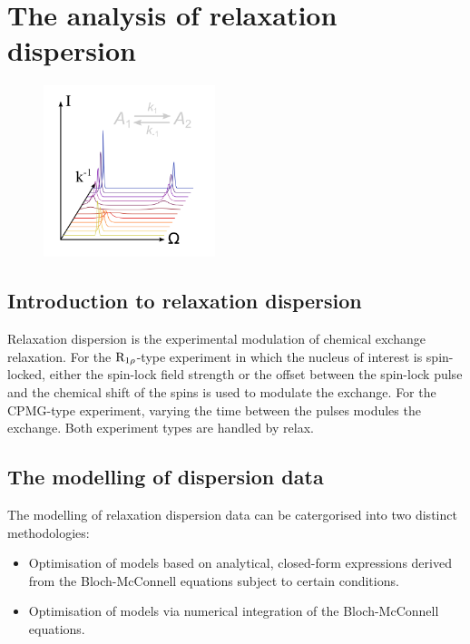 
\chapter[Relaxation dispersion]{The analysis of relaxation dispersion} \label{ch: relax-disp}

\begin{figure}[h]
\includegraphics[width=5cm, bb=0 0 1701 1701]{graphics/analyses/relax_disp_600x600}
\end{figure}



\section{Introduction to relaxation dispersion}

Relaxation dispersion is the experimental modulation of chemical exchange relaxation.  For the $\mathrm{R}_{1\rho}$-type experiment in which the nucleus of interest is spin-locked, either the spin-lock field strength or the offset between the spin-lock pulse and the chemical shift of the spins is used to modulate the exchange.  For the CPMG-type experiment, varying the time between the pulses modules the exchange.  Both experiment types are handled by relax.



\section{The modelling of dispersion data}

The modelling of relaxation dispersion data can be catergorised into two distinct methodologies:

\begin{itemize}
\item Optimisation of models based on analytical, closed-form expressions derived from the Bloch-McConnell equations subject to certain conditions.
\item Optimisation of models via numerical integration of the Bloch-McConnell equations.
\end{itemize}

